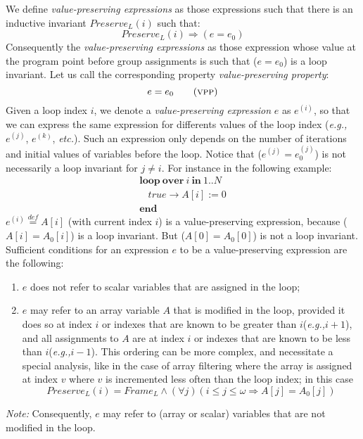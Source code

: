 \documentclass[a4paper,10pt]{article}
\newcommand{\eg}{\textit{e.g.,}\xspace}
\newcommand{\etc}{\textit{etc.}\xspace}
\newcommand{\idx}{\ensuremath{i}\xspace}
\newcommand{\idxfinal}{\ensuremath{\omega}\xspace}
\newcommand{\KWloop}{\ensuremath{\mathrm{\textbf{loop}}~}}
\newcommand{\KWend}{\ensuremath{\mathrm{\textbf{end}}}}
\newcommand{\KWover}{\ensuremath{\mathrm{\textbf{over}}~}}
\newcommand{\KWin}{\ensuremath{~\mathrm{\textbf{in}}~}}
\newcommand{\at}[1]{{(#1)}}
\newcommand{\framecond}[1]{\ensuremath{\mathit{Frame_{#1}}}}
\newcommand{\preservecond}[2]{\ensuremath{\mathit{Preserve_{#1}(#2)}}}
\newcommand{\patternnote}{\noindent\textit{Note:}\xspace}
\newcommand{\symdef}{\ensuremath{\overset{\mathit{def}}{=}}}
\newcommand{\vpp}{\textsc{vpp}\xspace}
\begin{document}
We define \textit{value-preserving expressions} as those expressions
such that there is an inductive invariant \preservecond{L}{\idx} such that:
$$\preservecond{L}{\idx} \Rightarrow (e = e_0)$$
% 
Consequently the \textit{value-preserving expressions} as those expression
whose value at the program point before group assignments is such that ($e=e_0$) 
is a loop invariant. Let us call the corresponding property \textit{value-preserving property}:
\begin{equation}
 e=e_0 \tag{\vpp}
\end{equation}
%
Given a loop index \idx, we denote a \textit{value-preserving expression} $e$
as $e^\at{\idx}$, so that we can express the same expression for differents
values of the loop index (\eg $e^\at{j}$, $e^\at{k}$, \etc). Such an expression
only depends on the number of iterations and initial values of variables
before the loop. Notice that ($e^\at{j} = e_0^\at{j}$) is not necessarily a
loop invariant for $j \neq i$.  For instance in the following example:
$$\begin{array}{l}
  \KWloop \KWover i \KWin 1 .. N \\
  ~~~~ \mathit{true} \rightarrow A[i] := 0\\
  \KWend
\end{array}$$
$e^\at{\idx} \symdef A[\idx]$ (with current index \idx) is a 
value-preserving expression, because ($A[\idx]=A_0[\idx]$) is a loop 
invariant. But ($A[0]=A_0[0]$) is not a loop invariant.
%
Sufficient conditions for an expression $e$ to be a value-preserving expression
are the following:
\begin{enumerate}
\item $e$ does not refer to scalar variables that are assigned in the loop;
\item $e$ may refer to an array variable $A$ that is modified in the loop,
  provided it does so at index \idx or indexes that are known to be greater
  than \idx (\eg $\idx + 1$), and all assignments to $A$ are at index \idx or
  indexes that are known to be less than \idx (\eg $\idx - 1$). This ordering
  can be more complex, and necessitate a special analysis, like in the case of
  array filtering where the array is assigned at index $v$ where $v$ is
  incremented less often than the loop index; in this case 
$$\preservecond{L}{\idx} = \framecond{L} \land (\forall j)(\idx \leq j \leq \idxfinal \Rightarrow A[j]=A_0[j])$$
\end{enumerate}
\patternnote
Consequently, $e$ may refer to (array or scalar) variables that are not modified in the loop.
\end{document}
